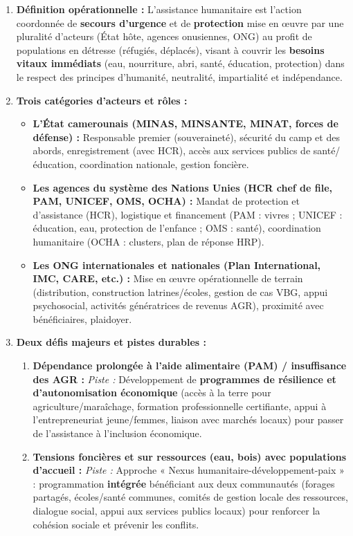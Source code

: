\documentclass[11pt]{article}
\newcommand{\cle}[1]{{\popxbold\color{popdark}#1}}
\begin{document}
\begin{corrige}
\begin{enumerate}
    \item \textbf{Définition opérationnelle :} L'assistance humanitaire est l'action coordonnée de \textbf{secours d'urgence} et de \textbf{protection} mise en œuvre par une pluralité d'acteurs (État hôte, agences onusiennes, ONG) au profit de populations en détresse (réfugiés, déplacés), visant à couvrir les \textbf{besoins vitaux immédiats} (eau, nourriture, abri, santé, éducation, protection) dans le respect des principes d'humanité, neutralité, impartialité et indépendance.
    \item \textbf{Trois catégories d'acteurs et rôles :}
    \begin{itemize}
        \item \textbf{L'État camerounais (MINAS, MINSANTE, MINAT, forces de défense) :} \cle{Responsable premier} (souveraineté), sécurité du camp et des abords, enregistrement (avec HCR), accès aux services publics de santé/éducation, coordination nationale, gestion foncière.
        \item \textbf{Les agences du système des Nations Unies (HCR chef de file, PAM, UNICEF, OMS, OCHA) :} \cle{Mandat de protection et d'assistance} (HCR), \cle{logistique et financement} (PAM : vivres ; UNICEF : éducation, eau, protection de l'enfance ; OMS : santé), \cle{coordination humanitaire} (OCHA : clusters, plan de réponse HRP).
        \item \textbf{Les ONG internationales et nationales (Plan International, IMC, CARE, etc.) :} \cle{Mise en œuvre opérationnelle de terrain} (distribution, construction latrines/écoles, gestion de cas VBG, appui psychosocial, activités génératrices de revenus AGR), \cle{proximité avec bénéficiaires}, \cle{plaidoyer}.
    \end{itemize}
    \item \textbf{Deux défis majeurs et pistes durables :}
    \begin{enumerate}
        \item \textbf{Dépendance prolongée à l'aide alimentaire (PAM) / insuffisance des AGR :} \emph{Piste :} Développement de \textbf{programmes de résilience et d'autonomisation économique} (accès à la terre pour agriculture/maraîchage, formation professionnelle certifiante, appui à l'entrepreneuriat jeune/femmes, liaison avec marchés locaux) pour passer de l'assistance à l'inclusion économique.
        \item \textbf{Tensions foncières et sur ressources (eau, bois) avec populations d'accueil :} \emph{Piste :} \cle{Approche « Nexus humanitaire-développement-paix »} : programmation \textbf{intégrée} bénéficiant aux deux communautés (forages partagés, écoles/santé communes, comités de gestion locale des ressources, dialogue social, appui aux services publics locaux) pour renforcer la \cle{cohésion sociale} et prévenir les conflits.
    \end{enumerate}
\end{enumerate}
\end{corrige}
\end{document}
